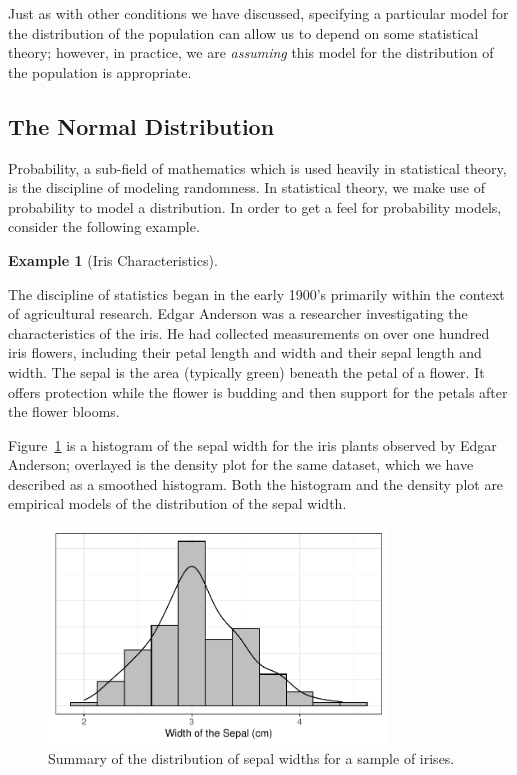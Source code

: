 \documentclass[
  letterpaper,
  DIV=11,
  numbers=noendperiod]{scrreprt}
\theoremstyle{plain}
\theoremstyle{definition}
\newtheorem{example}{Example}[chapter]
\theoremstyle{definition}
\theoremstyle{remark}
\begin{document}
Just as with other conditions we have discussed, specifying a particular
model for the distribution of the population can allow us to depend on
some statistical theory; however, in practice, we are \emph{assuming}
this model for the distribution of the population is appropriate.

\hypertarget{the-normal-distribution}{%
\subsection{The Normal Distribution}\label{the-normal-distribution}}

Probability, a sub-field of mathematics which is used heavily in
statistical theory, is the discipline of modeling randomness. In
statistical theory, we make use of probability to model a distribution.
In order to get a feel for probability models, consider the following
example.

\begin{example}[Iris
Characteristics]\protect\hypertarget{exm-iris}{}\label{exm-iris}

The discipline of statistics began in the early 1900's primarily within
the context of agricultural research. Edgar Anderson was a researcher
investigating the characteristics of the iris. He had collected
measurements on over one hundred iris flowers, including their petal
length and width and their sepal length and width. The sepal is the area
(typically green) beneath the petal of a flower. It offers protection
while the flower is budding and then support for the petals after the
flower blooms.

\end{example}

Figure~\ref{fig-regconditions-iris-histogram} is a histogram of the
sepal width for the iris plants observed by Edgar Anderson; overlayed is
the density plot for the same dataset, which we have described as a
smoothed histogram. Both the histogram and the density plot are
empirical models of the distribution of the sepal width.

\begin{figure}

{\centering \includegraphics[width=0.8\textwidth,height=\textheight]{./images/fig-regconditions-iris-histogram-1.pdf}

}

\caption{\label{fig-regconditions-iris-histogram}Summary of the
distribution of sepal widths for a sample of irises.}

\end{figure}
\end{document}
